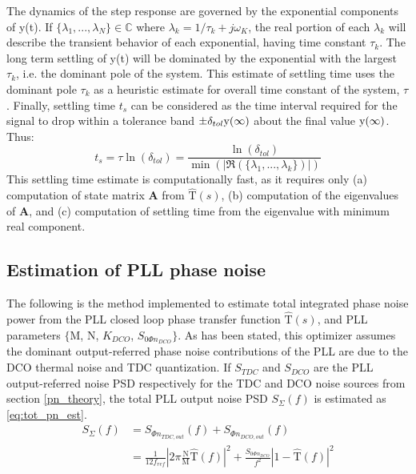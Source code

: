 
	The dynamics of the step response are governed by the exponential components of y(t). If  $\{\lambda_1, ... , \lambda_N\} \in \mathds{C}$ where $\lambda_k=1/\tau_k+j\omega_K$, the real portion of each $\lambda_k$ will describe the transient behavior of each exponential, having time constant $\tau_k$. The long term settling of y(t) will be dominated by the exponential with the largest $\tau_k$, i.e. the dominant pole of the system. This estimate of settling time uses the dominant pole $\tau_k$ as a heuristic estimate for overall time constant of the system, $\tau$. Finally, settling time $t_s$ can be considered as the time interval required for the signal to drop within a tolerance band $\pm \delta_{tol} \textnormal{y}(\infty)$ about the final value $\textnormal{y}(\infty)$. Thus:
	\begin{equation}
		t_s = \tau\ln(\delta_{tol}) = \frac{\ln(\delta_{tol})}{\min(|\Re(\{\lambda_1, ... , \lambda_k\})|)}
	\end{equation}
	This settling time estimate is computationally fast, as it requires only (a) computation of state matrix $\mathbf{A}$ from $\mathrm{\hat{T}}(s)$, (b) computation of the eigenvalues of $\mathbf{A}$, and (c) computation of settling time from the eigenvalue with minimum real component.

\subsection{Estimation of PLL phase noise}\label{est_pn}
	The following is the method implemented to estimate total integrated phase noise power from the PLL closed loop phase transfer function $\mathrm{\hat{T}}(s)$, and PLL parameters $\{\mathrm{M}$, $\mathrm{N}$, $K_{DCO}$, $S_{0\Phi n_{DCO}}\}$. As has been stated, this optimizer assumes the dominant output-referred phase noise contributions of the PLL are due to the DCO thermal noise and TDC quantization. If $S_{TDC}$ and $S_{DCO}$ are the PLL output-referred noise PSD respectively for the TDC and DCO noise sources from section \ref{pn_theory}, the total PLL output noise PSD $S_{\Sigma}(f)$ is estimated as \ref{eq:tot_pn_est}.
	\begin{align}\label{eq:tot_pn_est}
		S_{\Sigma}(f) &= S_{\Phi n_{TDC,out}}(f) + S_{\Phi n_{DCO,out}}(f)\\
		 &= \frac{1}{12f_{ref}}\left|2\pi\frac{\mathrm{N}}{\mathrm{M}}\hat{\mathrm{T}}(f)\right|^2 + \frac{S_{0\Phi n_{DCO}}}{f^2}\left|1-\hat{\mathrm{T}}(f)\right|^2
	\end{align}

